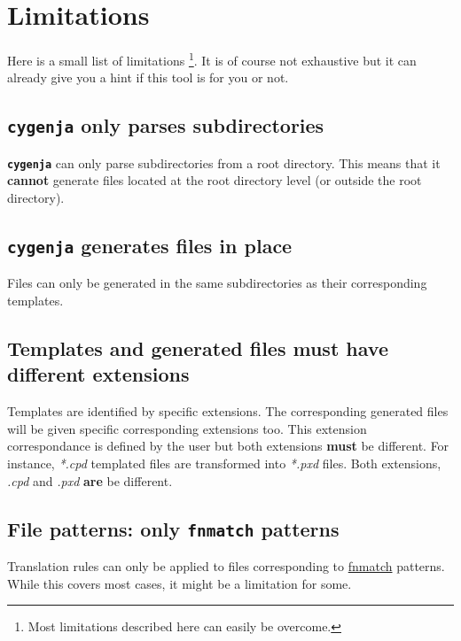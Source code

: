 \documentclass[letterpaper,10pt,english]{sphinxmanual}
\begin{document}
\section{Limitations}
\label{introduction:limitations}\label{introduction:id3}
Here is a small list of limitations \footnote[2]{
Most limitations described here can easily be overcome.
}. It is of course not exhaustive but it can already give you a hint if this tool is for you or not.


\subsection{\textbf{\texttt{cygenja}} only parses subdirectories}
\label{introduction:cygenja-only-parses-subdirectories}
\textbf{\texttt{cygenja}} can only parse subdirectories from a root directory. This means
that it \textbf{cannot} generate files located at the root directory level (or outside the root directory).


\subsection{\textbf{\texttt{cygenja}} generates files in place}
\label{introduction:cygenja-generates-files-in-place}
Files can only be generated in the same subdirectories as their corresponding templates.


\subsection{Templates and generated files \textbf{must} have different extensions}
\label{introduction:templates-and-generated-files-must-have-different-extensions}
Templates are identified by specific extensions. The corresponding generated files will be given specific corresponding extensions too. This extension correspondance is defined by the user but both extensions
\textbf{must} be different. For instance, \emph{*.cpd} templated files are transformed into \emph{*.pxd} files. Both extensions, \emph{.cpd} and \emph{.pxd} \textbf{are} be different.


\subsection{File patterns: only \textbf{\texttt{fnmatch}} patterns}
\label{introduction:file-patterns-only-fnmatch-patterns}
Translation rules can only be applied to files corresponding to \href{https://docs.python.org/2/library/fnmatch.html}{fnmatch} patterns. While this covers most cases, it might be a limitation for some.
\end{document}
